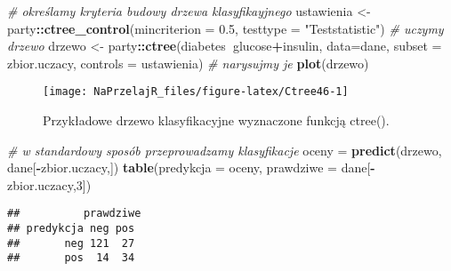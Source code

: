 \documentclass[polish,]{book}
\newenvironment{Shaded}{\begin{snugshade}}{\end{snugshade}}
\newcommand{\CommentTok}[1]{\textcolor[rgb]{0.56,0.35,0.01}{\textit{#1}}}
\newcommand{\DataTypeTok}[1]{\textcolor[rgb]{0.13,0.29,0.53}{#1}}
\newcommand{\DecValTok}[1]{\textcolor[rgb]{0.00,0.00,0.81}{#1}}
\newcommand{\FloatTok}[1]{\textcolor[rgb]{0.00,0.00,0.81}{#1}}
\newcommand{\KeywordTok}[1]{\textcolor[rgb]{0.13,0.29,0.53}{\textbf{#1}}}
\newcommand{\NormalTok}[1]{#1}
\newcommand{\OperatorTok}[1]{\textcolor[rgb]{0.81,0.36,0.00}{\textbf{#1}}}
\newcommand{\StringTok}[1]{\textcolor[rgb]{0.31,0.60,0.02}{#1}}
\begin{document}
\begin{Shaded}
\begin{Highlighting}[]
\CommentTok{# określamy kryteria budowy drzewa klasyfikayjnego}
\NormalTok{ustawienia <-}\StringTok{ }\NormalTok{party}\OperatorTok{::}\KeywordTok{ctree_control}\NormalTok{(}\DataTypeTok{mincriterion =} \FloatTok{0.5}\NormalTok{, }\DataTypeTok{testtype =} \StringTok{"Teststatistic"}\NormalTok{)}
\CommentTok{# uczymy drzewo}
\NormalTok{drzewo <-}\StringTok{ }\NormalTok{party}\OperatorTok{::}\KeywordTok{ctree}\NormalTok{(diabetes}\OperatorTok{~}\NormalTok{glucose}\OperatorTok{+}\NormalTok{insulin,}
                       \DataTypeTok{data=}\NormalTok{dane, }\DataTypeTok{subset =}\NormalTok{ zbior.uczacy, }\DataTypeTok{controls =}\NormalTok{ ustawienia)}
\CommentTok{# narysujmy je}
\KeywordTok{plot}\NormalTok{(drzewo)}
\end{Highlighting}
\end{Shaded}

\begin{figure}[h]

{\centering \texttt{[image: NaPrzelajR\_files/figure-latex/Ctree46-1]} 

}

\caption{Przykładowe drzewo klasyfikacyjne wyznaczone funkcją ctree().}\label{fig:Ctree46}
\end{figure}

\begin{Shaded}
\begin{Highlighting}[]
\CommentTok{# w standardowy sposób przeprowadzamy klasyfikacje}
\NormalTok{oceny =}\StringTok{ }\KeywordTok{predict}\NormalTok{(drzewo, dane[}\OperatorTok{-}\NormalTok{zbior.uczacy,])}
\KeywordTok{table}\NormalTok{(}\DataTypeTok{predykcja =}\NormalTok{ oceny, }\DataTypeTok{prawdziwe =}\NormalTok{ dane[}\OperatorTok{-}\NormalTok{zbior.uczacy,}\DecValTok{3}\NormalTok{])}
\end{Highlighting}
\end{Shaded}

\begin{verbatim}
##          prawdziwe
## predykcja neg pos
##       neg 121  27
##       pos  14  34
\end{verbatim}
\end{document}
